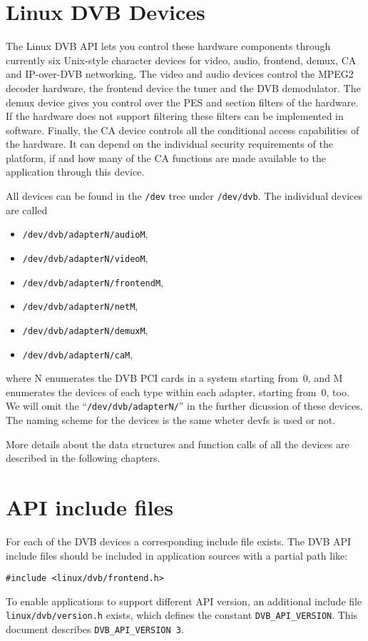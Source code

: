 \section{Linux DVB Devices}

The Linux DVB API lets you control these hardware components 
through currently six Unix-style character devices for 
video, audio, frontend, demux, CA and IP-over-DVB networking. 
The video and audio devices control the MPEG2 decoder hardware,
the frontend device the tuner and the DVB demodulator.
The demux device gives you control over the PES and section filters 
of the hardware. If the hardware does not support filtering these filters 
can be implemented in software.
Finally, the CA device controls all the conditional access capabilities 
of the hardware. It can depend on the individual security requirements 
of the platform, if and how many of the CA functions are made available 
to the application through this device.

\smallskip
All devices can be found in the \texttt{/dev} tree under 
\texttt{/dev/dvb}.  The individual devices are called 
\begin{itemize}
\item \texttt{/dev/dvb/adapterN/audioM},
\item \texttt{/dev/dvb/adapterN/videoM},
\item \texttt{/dev/dvb/adapterN/frontendM},
\item \texttt{/dev/dvb/adapterN/netM},
\item \texttt{/dev/dvb/adapterN/demuxM},
\item \texttt{/dev/dvb/adapterN/caM},
\end{itemize}
where N enumerates the DVB PCI cards in a system starting from~0,
and M enumerates the devices of each type within each adapter, starting
from~0, too.
We will omit the ``\texttt{/dev/dvb/adapterN/}'' in the further dicussion of 
these devices.  The naming scheme for the devices is the same wheter devfs
is used or not.

More details about the data structures and function calls of 
all the devices are described in the following chapters.

\section{API include files}

For each of the DVB devices a corresponding include file
exists. The DVB API include files should be included
in application sources with a partial path like:

\begin{verbatim}
#include <linux/dvb/frontend.h>
\end{verbatim}

To enable applications to support different API version, an additional
include file \texttt{linux/dvb/version.h} exists, which defines the
constant \texttt{DVB\_API\_VERSION}. This document describes
\texttt{DVB\_API\_VERSION~3}.

